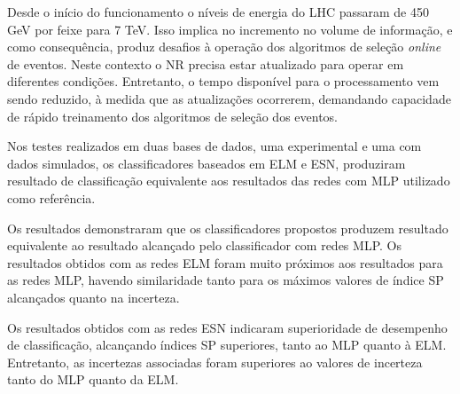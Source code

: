 
Desde o início do funcionamento o níveis de energia do LHC passaram de 450 GeV por feixe para 7 TeV. Isso implica no incremento no volume de informação, e como consequência, produz desafios à operação dos algoritmos de seleção \textit{online} de eventos. Neste contexto o NR precisa estar atualizado para operar em diferentes condições. Entretanto, o tempo disponível para o processamento vem sendo reduzido, à medida que as atualizações ocorrerem, demandando capacidade de rápido treinamento dos algoritmos de seleção dos eventos.

Nos testes realizados em duas bases de dados, uma experimental e uma com dados simulados, os classificadores baseados em ELM e ESN, produziram resultado de classificação equivalente aos resultados das redes com MLP utilizado como referência. %

Os resultados demonstraram que os classificadores propostos produzem resultado equivalente ao resultado alcançado pelo classificador com redes MLP. Os resultados obtidos com as redes ELM foram muito próximos aos resultados para as redes MLP, havendo similaridade tanto para os máximos valores de índice SP alcançados quanto na incerteza.

Os resultados obtidos com as redes ESN indicaram superioridade de desempenho de classificação, alcançando índices SP superiores, tanto ao MLP quanto à ELM. Entretanto, as incertezas associadas foram superiores ao valores de incerteza tanto do MLP quanto da ELM.


